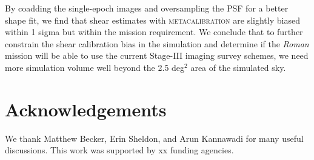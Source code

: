\documentclass[fleqn,usenatbib]{mnras}
\begin{document}
By coadding the single-epoch images and oversampling the PSF for a better shape fit, we find that shear estimates with \textsc{metacalibration} are slightly biased within 1 sigma but within the mission requirement. We conclude that to further constrain the shear calibration bias in the simulation and determine if the \emph{Roman} mission will be able to use the current Stage-III imaging survey schemes, we need more simulation volume well beyond the 2.5 deg$^{2}$ area of the simulated sky. 



\section*{Acknowledgements}

We thank Matthew Becker, Erin Sheldon, and Arun Kannawadi for many useful discussions. This work was supported by xx funding agencies.


 









\end{document}
